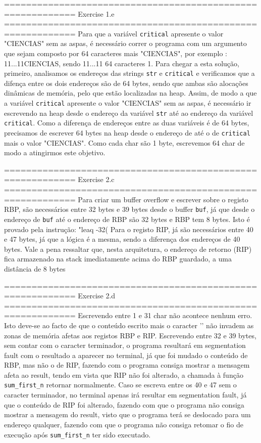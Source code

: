 ===========================================================
Exercise 1.e
===========================================================
Para que a variável \texttt{critical} apresente o valor "CIENCIAS" sem as aspas, é necessário correr o programa com um argumento que sejam 
composto por 64 caracteres mais "CIENCIAS", por exemplo : 11...11CIENCIAS, sendo 11...11 64 caracteres 1.
Para chegar a esta solução, primeiro, analisamos os endereços das strings \texttt{str} e \texttt{critical} e verificamos que a difença entre os dois
endereços são de 64 bytes, sendo que ambas são alocações dinâmicas de memória, pelo que estão localizadas na heap.
Assim, de modo a que a variável \texttt{critical} apresente o valor "CIENCIAS" sem as aspas, é necessário ir escrevendo na heap desde o endereço da variável 
\texttt{str} até ao endereço da variável \texttt{critical}.
Como a diferença de endereços entre as duas variáveis é de 64 bytes, precisamos de escrever 64 bytes na heap desde o endereço de  até
o de \texttt{critical} mais o valor "CIENCIAS". Como cada char são 1 byte, escrevemos 64 char de modo a atingirmos este objetivo. 

===========================================================
Exercise 2.c
===========================================================
Para criar um buffer overflow e escrever sobre o registo RBP, são necessários entre 32 bytes e 39 bytes desde o buffer \texttt{buf}, 
já que desde o endereço de \texttt{buf} até o endereço de RBP são 32 bytes e RBP tem 8 bytes. Isto é provado pela instrução: 
"leaq -32(%
Para o registo RIP, já são necessários entre 40 e 47 bytes, já que a lógica é a mesma, sendo a diferença dos endereços de 40 bytes.
Vale a pena ressaltar que, nesta arquitetura, o endereço de retorno (RIP) fica armazenado na stack imediatamente acima do RBP 
guardado, a uma distância de 8 bytes

===========================================================
Exercise 2.d
===========================================================
Escrevendo entre 1 e 31 char não acontece nenhum erro. Isto deve-se ao facto de que o conteúdo escrito mais o caracter '\0' não invadem as zonas de
memória afetas aos registos RBP e RIP. Escrevendo entre 32 e 39 bytes, sem contar com o caracter terminador, o programa resultará em segmentation fault
com o resultado a aparecer no terminal, já que foi mudado o conteúdo de RBP, mas não o de RIP, fazendo com o programa consiga mostrar a mensagem afeta 
ao result, tendo em vista que RIP não foi alterado, a chamada à função \texttt{sum_first_n} retornar normalmente.
Caso se escreva entre os 40 e 47 sem o caracter terminador, no terminal apenas irá resultar em segmentation fault, já que o conteúdo de RIP foi alterado,
fazendo com que o programa não consiga mostrar a mensagem do result, visto que o programa terá se deslocado para um endereço qualquer, fazendo com
que o programa não consiga retomar o fio de execução após \texttt{sum_first_n} ter sido executado.

